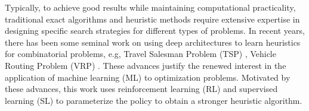 



Typically, to achieve good results while maintaining computational 
practicality, traditional exact algorithms and heuristic methods require 
extensive expertise in designing specific search strategies for different 
types of problems. In recent years, %
there has been some seminal work on using deep architectures to learn heuristics for combinatorial problems, e.g, Travel Salesman Problem (TSP) \cite{bello2016neural,vinyals2015pointer,kool2018attention}, Vehicle Routing Problem (VRP) \cite{nazari2018deep}. These advances justify the renewed interest in the application of machine learning (ML) to optimization problems. Motivated by these advances, this work uses reinforcement learning (RL) and supervised learning (SL) to parameterize the policy to obtain a stronger heuristic algorithm.

